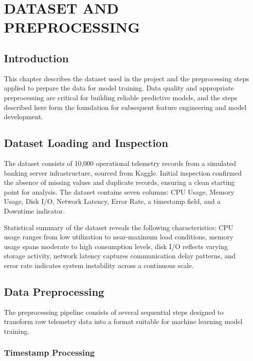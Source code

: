 \documentclass[12pt,letterpaper]{report}
\begin{document}
\chapter{DATASET AND PREPROCESSING}

\section{Introduction}

This chapter describes the dataset used in the project and the preprocessing steps applied to prepare the data for model training. Data quality and appropriate preprocessing are critical for building reliable predictive models, and the steps described here form the foundation for subsequent feature engineering and model development.

\section{Dataset Loading and Inspection}

The dataset consists of 10,000 operational telemetry records from a simulated banking server infrastructure, sourced from Kaggle. Initial inspection confirmed the absence of missing values and duplicate records, ensuring a clean starting point for analysis. The dataset contains seven columns: CPU Usage, Memory Usage, Disk I/O, Network Latency, Error Rate, a timestamp field, and a Downtime indicator.

Statistical summary of the dataset reveals the following characteristics: CPU usage ranges from low utilization to near-maximum load conditions, memory usage spans moderate to high consumption levels, disk I/O reflects varying storage activity, network latency captures communication delay patterns, and error rate indicates system instability across a continuous scale.

\section{Data Preprocessing}

The preprocessing pipeline consists of several sequential steps designed to transform raw telemetry data into a format suitable for machine learning model training.

\subsection{Timestamp Processing}
\end{document}
